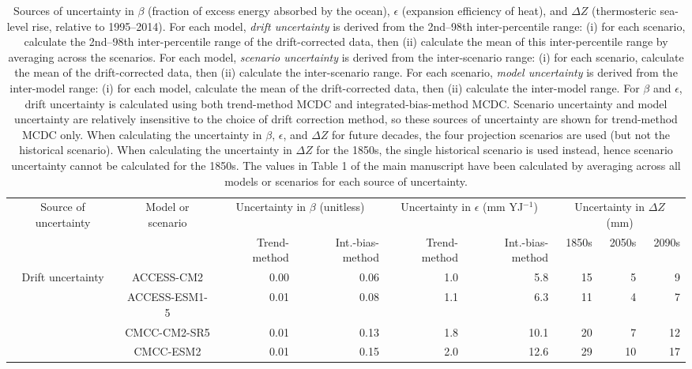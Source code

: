 \begin{table*}[t]
\centering
\caption{Sources of uncertainty in $\beta$ (fraction of excess energy absorbed by the ocean), $\epsilon$ (expansion efficiency of heat), and ${\Delta}Z$ (thermosteric sea-level rise, relative to 1995--2014). For each model, \emph{drift uncertainty} is derived from the 2nd--98th inter-percentile range: (i) for each scenario, calculate the 2nd--98th inter-percentile range of the drift-corrected data, then (ii) calculate the mean of this inter-percentile range by averaging across the scenarios. For each model, \emph{scenario uncertainty} is derived from the inter-scenario range: (i) for each scenario, calculate the mean of the drift-corrected data, then (ii) calculate the inter-scenario range. For each scenario, \emph{model uncertainty} is derived from the inter-model range: (i) for each model, calculate the mean of the drift-corrected data, then (ii) calculate the inter-model range. For $\beta$ and $\epsilon$, drift uncertainty is calculated using both trend-method MCDC and integrated-bias-method MCDC. Scenario uncertainty and model uncertainty are relatively insensitive to the choice of drift correction method, so these sources of uncertainty are shown for trend-method MCDC only. When calculating the uncertainty in $\beta$, $\epsilon$, and ${\Delta}Z$ for future decades, the four projection scenarios are used (but not the historical scenario). When calculating the uncertainty in ${\Delta}Z$ for the 1850s, the single historical scenario is used instead, hence scenario uncertainty cannot be calculated for the 1850s. The values in Table 1 of the main manuscript have been calculated by averaging across all models or scenarios for each source of uncertainty.}
\begin{tabular}{c|c|rr|rr|rrr}
\toprule
Source of uncertainty & Model or scenario & \multicolumn{2}{c|}{Uncertainty in $\beta$ (unitless)} & \multicolumn{2}{c|}{Uncertainty in $\epsilon$ (mm YJ$^{-1}$)} & \multicolumn{3}{c}{Uncertainty in ${\Delta}Z$ (mm)} \\
 &  & Trend-method & Int.-bias-method & Trend-method & Int.-bias-method & 1850s & 2050s & 2090s \\
\midrule
\multirow[c]{16}{*}{Drift uncertainty} & ACCESS-CM2 & 0.00 & 0.06 & 1.0 & 5.8 & 15 & 5 & 9 \\
 & ACCESS-ESM1-5 & 0.01 & 0.08 & 1.1 & 6.3 & 11 & 4 & 7 \\
 & CMCC-CM2-SR5 & 0.01 & 0.13 & 1.8 & 10.1 & 20 & 7 & 12 \\
 & CMCC-ESM2 & 0.01 & 0.15 & 2.0 & 12.6 & 29 & 10 & 17 \\

\end{tabular}
\end{table*}
